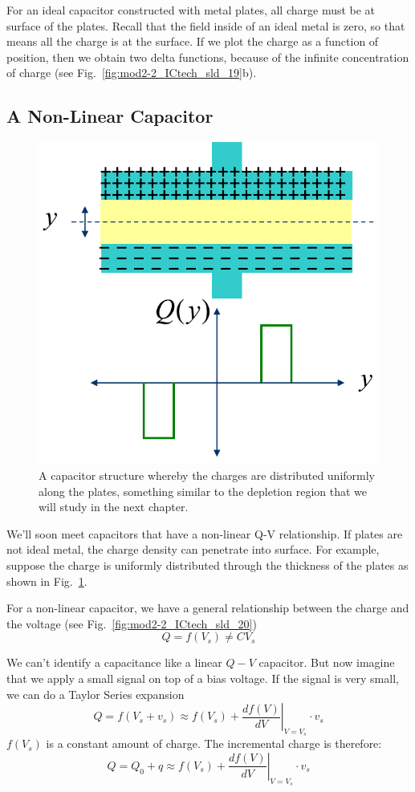 For an ideal capacitor constructed with metal plates, all charge must be at surface of the plates.  Recall that the field inside of an ideal metal is zero, so that means all the charge is at the surface.  If we plot the charge as a function of position, then we obtain two delta functions, because of the infinite concentration of charge (see Fig.~\ref{fig:mod2-2_ICtech_sld_19}b).
 

\subsection{A Non-Linear Capacitor}


\begin{figure}[tb]
\begin{center}
\includegraphics[width=.5\columnwidth]{mod2-2_ICtech_sld_20b} 
\end{center}
\caption{A capacitor structure whereby the charges are distributed uniformly along the plates, something similar to the depletion region that we will study in the next chapter.} \label{fig:mod2-2_ICtech_sld_20b}
\end{figure}


We’ll soon meet capacitors that have a non-linear Q-V relationship.  
 If plates are not ideal metal, the charge density can penetrate into surface.  For example, suppose the charge is uniformly distributed through the thickness of the plates as shown in Fig.~\ref{fig:mod2-2_ICtech_sld_20b}.
 
For a non-linear capacitor, we have a general relationship between the charge and the voltage (see Fig.~\ref{fig:mod2-2_ICtech_sld_20})
%
\begin{equation} 
	Q = f({V_s}) \ne C{V_s} 
\end{equation}

We can’t identify a capacitance like a linear $Q-V$ capacitor.  But now imagine that  we apply a small signal on top of a bias voltage.  If the signal is very small, we can do a Taylor Series expansion
%
\begin{equation} 
	Q = f({V_s} + {v_s}) \approx f({V_s}) + {\left. {\frac{{df(V)}}{{dV}}} \right|_{V = {V_s}}} \cdot {v_s} 
\end{equation}
%
$f(V_s)$ is a constant amount of charge.  The incremental charge is therefore:
\begin{equation} 
	Q = {Q_0} + q \approx f({V_s}) + {\left. {\frac{{df(V)}}{{dV}}} \right|_{V = {V_s}}} \cdot {v_s} 
\end{equation}


